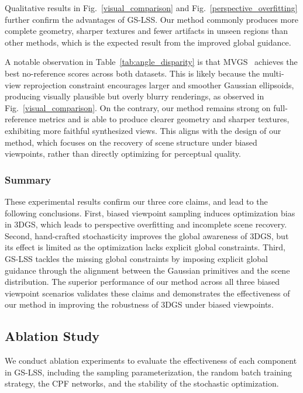 \documentclass[lettersize,journal]{IEEEtran}
\begin{document}
Qualitative results in Fig.~\ref{visual_comparison} and Fig.~\ref{perspective_overfitting} further confirm the advantages of GS-LSS. Our method commonly produces more complete geometry, sharper textures and fewer artifacts in unseen regions than other methods, which is the expected result from the improved global guidance. 

A notable observation in Table~\ref{tab:angle_disparity} is that MVGS~\cite{mvgs} achieves the best no-reference scores across both datasets.
This is likely because the multi-view reprojection constraint encourages larger and smoother Gaussian ellipsoids, 
producing visually plausible but overly blurry renderings, as observed in Fig.~\ref{visual_comparison}. 
On the contrary, our method remains strong on full-reference metrics and is able to produce clearer geometry and sharper textures, exhibiting more faithful synthesized views. This aligns with the design of our method, which focuses on the recovery of scene structure under biased viewpoints, rather than directly optimizing for perceptual quality.


\subsubsection{Summary}

These experimental results confirm our three core claims, and lead to the following conclusions. 
First, biased viewpoint sampling induces optimization bias in 3DGS, which leads to perspective overfitting and incomplete scene recovery. 
Second, hand-crafted stochasticity improves the global awareness of 3DGS, but its effect is limited as the optimization lacks explicit global constraints. 
Third, GS-LSS tackles the missing global constraints by imposing explicit global guidance through the alignment between the Gaussian primitives and the scene distribution.
The superior performance of our method across all three biased viewpoint scenarios validates these claims and demonstrates the effectiveness of our method in improving the robustness of 3DGS under biased viewpoints.


\subsection{Ablation Study}

We conduct ablation experiments to evaluate the effectiveness of each component in GS-LSS, including the sampling parameterization, the random batch training strategy, the CPF networks, and the stability of the stochastic optimization.
\end{document}
